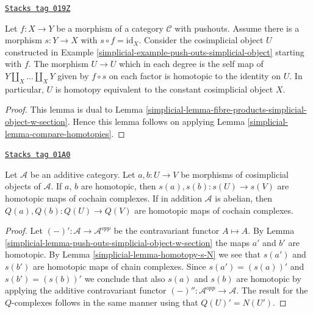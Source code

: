 \begin{lemma}
\label{simplicial-lemma-push-outs-simplicial-object-w-section}
\href{https://stacks.math.columbia.edu/tag/019Z}{\texttt{Stacks tag 019Z}}

Let $f : X \to Y$ be a morphism of a category $\mathcal{C}$ with
pushouts. Assume there is a morphism $s : Y \to X$ with
$s \circ f = \text{id}_X$. Consider the cosimplicial object $U$ constructed in
Example \ref{simplicial-example-push-outs-simplicial-object}
starting with $f$. The morphism $U \to U$ which in each degree
is the self map of $Y \amalg_X \ldots \amalg_X Y$
given by $f \circ s$ on each factor is homotopic to the identity on $U$.
In particular, $U$ is homotopy equivalent to the constant
cosimplicial object $X$.
\end{lemma}

\begin{proof}

This lemma is dual to
Lemma \ref{simplicial-lemma-fibre-products-simplicial-object-w-section}.
Hence this lemma follows on applying
Lemma \ref{simplicial-lemma-compare-homotopies}.
\end{proof}

\begin{lemma}
\label{simplicial-lemma-homotopy-s-Q}
\href{https://stacks.math.columbia.edu/tag/01A0}{\texttt{Stacks tag 01A0}}


Let $\mathcal{A}$ be an additive category. Let $a, b : U \to V$ be morphisms
of cosimplicial objects of $\mathcal{A}$. If $a$, $b$ are homotopic,
then $s(a), s(b) : s(U) \to s(V)$ are homotopic maps of cochain complexes.
If in addition $\mathcal{A}$ is abelian, then $Q(a), Q(b) : Q(U) \to Q(V)$
are homotopic maps of cochain complexes.
\end{lemma}

\begin{proof}

Let $(-)' : \mathcal{A} \to \mathcal{A}^{opp}$
be the contravariant functor $A \mapsto A$. By
Lemma \ref{simplicial-lemma-push-outs-simplicial-object-w-section}
the maps $a'$ and $b'$ are homotopic.
By Lemma \ref{simplicial-lemma-homotopy-s-N} we see that
$s(a')$ and $s(b')$ are homotopic maps of chain
complexes. Since $s(a') = (s(a))'$ and
$s(b') = (s(b))'$ we conclude that also
$s(a)$ and $s(b)$ are homotopic by applying the additive
contravariant functor $(-)'' : \mathcal{A}^{opp} \to \mathcal{A}$.
The result for the $Q$-complexes follows in the same manner
using that $Q(U)' = N(U')$.
\end{proof}

